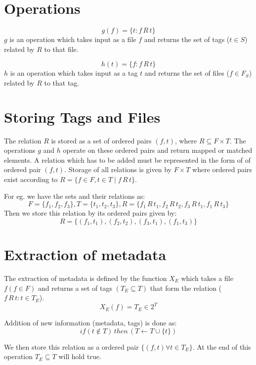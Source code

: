 \section{Operations}
$$g(f) = \{t : f \, R \, t\}$$
$g$ is an operation which takes input as a file $f$ and returns the set of tags ($t \in S$) related by $R$ to that file.

$$h(t) = \{f : f \, R \, t\}$$
$h$ is an operation which takes input as a tag $t$ and returns the set of files ($f \in F_{S}$) related by $R$ to that tag.


\section{Storing Tags and Files}
The relation $R$ is stored as a set of ordered pairs $(f,t)$, where $R \subseteq F \times T$. The operations $g$ and $h$ operate on these ordered pairs and return mapped or matched elements. A relation which has to be added must be represented in the form of of ordered pair $(f,t)$. Storage of all relations is given by $F \times T$ where ordered pairs exist according to $R = \{f \in F, t \in T \mid f\, R \,t\}$.

\noindent For eg. we have the sets and their relations as: 
$$F = \{ f_{1}, f_{2}, f_{3} \}, T = \{ t_{1}, t_{2}, t_{3} \}, R = \{f_{1} \, R  \, t_{1}, f_{2}  \, R  \, t_{2}, f_{3}  \, R  \, t_{1}, f_{1}  \, R  \, t_{3}\}$$
Then we store this relation by its ordered pairs given by:
$$R = \{(f_{1},t_{1}),(f_{2}, t_{2}),(f_{3}, t_{1}),(f_{1}, t_{3})\}$$

\section{Extraction of metadata}
The extraction of metadata is defined by the function $X_{E}$ which takes a file $f(f \in F)$ and returns a set of tags $(T_{E} \subseteq T)$ that form the relation ($f  \, R  \, t : t \in T_{E}$). 
$$X_{E}(f) = T_{E} \in 2^{T}$$

\noindent Addition of new information (metadata, tags) is done as:
$${if (t \notin T) \, then \, (T \gets T \cup \{t\})}$$

\noindent We then store this relation as a ordered pair $\{(f,t) \forall t \in T_{E}\}$. At the end of this operation $T_{E} \subseteq T$ will hold true. 

